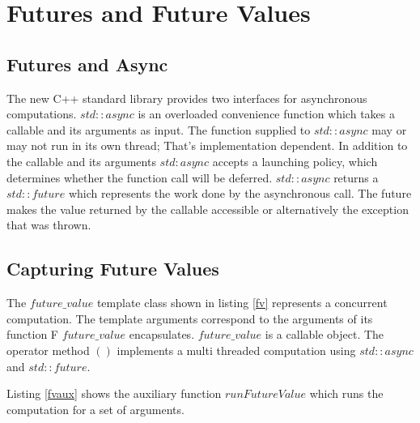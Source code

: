 \documentclass[12pt,fleqn]{article}
\begin{document}
\section{Futures and Future Values}
%
%

%
%
\subsection{Futures and Async}
%

The new C++ standard library provides two interfaces for asynchronous computations.
$std::async$ is an overloaded convenience function which takes a callable and its arguments as input.
The function supplied to $std::async$ may or may not run in its own thread; That's implementation dependent.
In addition to the callable and its arguments $std:async$ accepts a launching policy, which determines whether the function call will be deferred.
$std::async$ returns a $std::future$ which represents the work done by the asynchronous call.
The future makes the value returned by the callable accessible or alternatively the exception that was thrown.




\subsection{Capturing Future Values}
%
%
%

The $future\_value$ template class shown in listing \ref{fv} represents a concurrent computation.
The template arguments correspond to the arguments of its function F $future\_value$ encapsulates.
$future\_value$ is a callable object.
The operator method $()$ implements a multi threaded computation using $std::async$ and $std::future$.

Listing \ref{fvaux} shows the auxiliary function $runFutureValue$ which runs the computation for a set of arguments.
\end{document}

